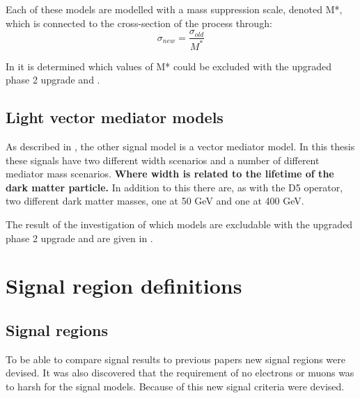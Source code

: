 Each of these models are modelled with a mass suppression scale, denoted M*, which is connected to the cross-section of the process through:
\begin{equation}
\sigma_{new} = \frac{\sigma_{old}}{M^*} 
\end{equation}

In  it is determined which values of M* could be excluded with the upgraded \abbrLHC phase 2 upgrade and \abbrATLAS .

\subsection{Light vector mediator models}\label{sec:signal:subsec:vecmed}
As described in , the other signal model is a vector mediator model. In this thesis these signals have two different width scenarios and a number of different mediator mass scenarios. \textbf{Where width is related to the lifetime of the dark matter particle.} In addition to this there are, as with the D5 operator, two different dark matter masses, one at 50 GeV and one at 400 GeV.

The result of the investigation of which models are excludable with the upgraded \abbrLHC phase 2 upgrade and \abbrATLAS are given in . 
 
\newpage
\section{Signal region definitions}
\subsection{Signal regions}
To be able to compare signal results to previous papers new signal regions were devised. It was also discovered that the requirement of no electrons or muons was to harsh for the signal models. Because of this new signal criteria were devised.

